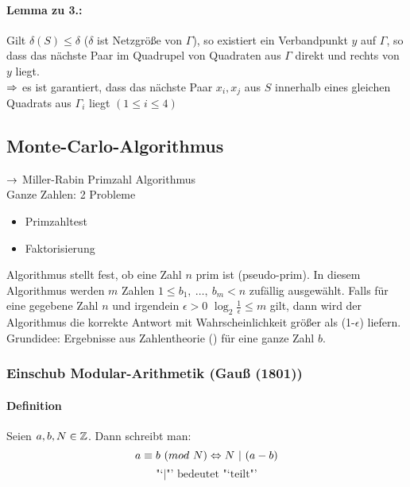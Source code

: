 \documentclass[a4paper]{scrartcl}
\begin{document}
\paragraph{Lemma zu 3.:} Gilt $\delta(S) \leq \delta$ ($\delta$ ist Netzgröße von $\Gamma$), so existiert ein Verbandpunkt $y$ auf $\Gamma$, so dass das nächste Paar im Quadrupel von Quadraten aus $\Gamma$ direkt und rechts von $y$ liegt. \\
$\Rightarrow$ es ist garantiert, dass das nächste Paar $x_i, x_j$ aus $S$ innerhalb eines gleichen Quadrats aus $\Gamma_i$ liegt 
$(1\leq i \leq 4)$

\subsection{Monte-Carlo-Algorithmus}
$\rightarrow$ Miller-Rabin Primzahl Algorithmus \\
Ganze Zahlen: 2 Probleme
\begin{itemize}
	\item Primzahltest
	\item Faktorisierung
\end{itemize}

Algorithmus stellt fest, ob eine Zahl $n$ prim ist (pseudo-prim). In diesem Algorithmus werden $m$ Zahlen $1\leq b_1,\ \ldots,\ b_m<n$ zufällig ausgewählt. Falls für eine gegebene Zahl $n$ und irgendein $\epsilon>0$ $\log_2\frac{1}{\epsilon}\leq m$ gilt, dann wird der Algorithmus die korrekte Antwort mit Wahrscheinlichkeit größer als (1-$\epsilon$) liefern.\\
Grundidee: Ergebnisse aus Zahlentheorie () für eine ganze Zahl $b$.\\



\def\ggT{\text{ ggT}}

\subsubsection{Einschub Modular-Arithmetik (Gauß (1801))}
\paragraph{Definition}
Seien $a,b,N\in \mathbb{Z}$. Dann schreibt man:
$$a \equiv b\ (mod\ N) \Gdw N\ |\ (a-b)$$
$$\text{"`$|$"' bedeutet "`teilt"'}$$
\end{document}
